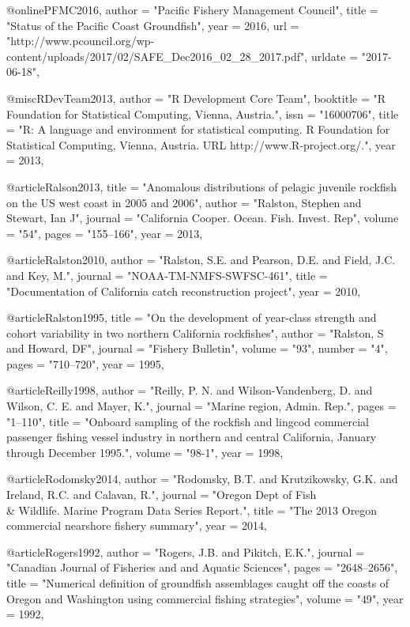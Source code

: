 @online{PFMC2016,
    author = "{Pacific Fishery Management Council}",
    title = "{{Status of the Pacific Coast Groundfish\nFishery}}",
    year = 2016,
    url = "{http://www.pcouncil.org/wp-content/uploads/2017/02/SAFE_Dec2016_02_28_2017.pdf}",
    urldate = "{2017-06-18}",
}

@misc{RDevTeam2013, 
    author = "{{R Development Core Team}}",
    booktitle = "{R Foundation for Statistical Computing, Vienna, Austria.}",
    issn = "{16000706}",
    title = "{{R: A language and environment for statistical computing. R Foundation for Statistical Computing, Vienna, Austria. URL http://www.R-project.org/.}}",
    year = 2013,
}

@article{Ralson2013,
    title = "{Anomalous distributions of pelagic juvenile rockfish on the US west coast in 2005 and 2006}",
    author = "{Ralston, Stephen and Stewart, Ian J}",
    journal = "{California Cooper. Ocean. Fish. Invest. Rep}",
    volume = "{54}",
    pages = "{155--166}",
    year = 2013,
}

@article{Ralston2010,
    author = "{Ralston, S.E. and Pearson, D.E. and Field, J.C. and Key, M.}",
    journal = "{NOAA-TM-NMFS-SWFSC-461}",
    title = "{{Documentation of California catch reconstruction project}}",
    year = 2010,
}

@article{Ralston1995,
    title = "{On the development of year-class strength and cohort variability in two northern California rockfishes}",
    author = "{Ralston, S and Howard, DF}",
    journal = "{Fishery Bulletin}",
    volume = "{93}",
    number = "{4}",
    pages = "{710--720}",
    year = 1995,
}

@article{Reilly1998,
    author = "{Reilly, P. N. and Wilson-Vandenberg, D. and Wilson, C. E. and Mayer, K.}",
    journal = "{Marine region, Admin. Rep.}",
    pages = "{1--110}",
    title = "{{Onboard sampling of the rockfish and lingcod commercial passenger fishing vessel industry in northern and central California, January through December 1995.}}",
    volume = "{98-1}",
    year = 1998,
}

@article{Rodomsky2014,
    author = "{Rodomsky, B.T. and Krutzikowsky, G.K. and Ireland, R.C. and Calavan, R.}",
    journal = "{Oregon Dept of Fish \\& Wildlife. Marine Program Data Series Report.}",
    title = "{{The 2013 Oregon commercial nearshore fishery summary}}",
    year = 2014,
}

@article{Rogers1992,
    author = "{Rogers, J.B. and Pikitch, E.K.}",
    journal = "{Canadian Journal of Fisheries and and Aquatic Sciences}",
    pages = "{2648--2656}",
    title = "{{Numerical definition of groundfish assemblages caught off the coasts of Oregon and Washington using commercial fishing strategies}}",
    volume = "{49}",
    year = 1992,
}


